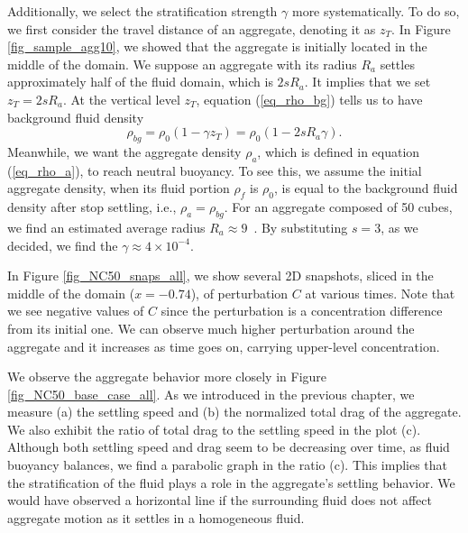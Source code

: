 \par
Additionally, we select the stratification strength $\gamma$ more systematically. 
To do so, we first consider the travel distance of an aggregate, denoting it as $z_T$. In Figure \ref{fig_sample_agg10}, we showed that the aggregate is initially located in the middle of the domain. We suppose an aggregate with its radius $R_a$ settles approximately half of the fluid domain, which is $2 s R_a$. It implies that we set $z_T = 2sR_a$.
At the vertical level $z_T$, equation (\ref{eq_rho_bg}) tells us to have background fluid density 
\begin{equation}
	\rho_{bg} = \rho_0 (1-\gamma z_T) =	\rho_0 (1 - 2sR_a \gamma).
	\label{eq_compute_G}
\end{equation}
Meanwhile, we want the aggregate density $\rho_a$, which is defined in equation (\ref{eq_rho_a}), to reach neutral buoyancy. To see this, we assume the initial aggregate density, when its fluid portion $\rho_f$ is $\rho_0$, is equal to the background fluid density after stop settling, i.e., $\rho_a = \rho_{bg}$. 
For an aggregate composed of 50 cubes, we find an estimated average radius $R_a \approx 9$~\cite{yoo_hydrodynamic_2020}. By substituting $s = 3$, as we decided, we find the $\gamma \approx 4 \times 10^{-4}$.  
\par 
In Figure \ref{fig_NC50_snaps_all}, we show several 2D snapshots, sliced in the middle of the domain ($x = -0.74$), of perturbation $C$ at various times. Note that we see negative values of $C$ since the perturbation is a concentration difference from its initial one. 
We can observe much higher perturbation around the aggregate and it increases as time goes on, carrying upper-level concentration. 
\par
We observe the aggregate behavior more closely in Figure \ref{fig_NC50_base_case_all}. As we introduced in the previous chapter, we measure (a) the settling speed and (b) the normalized total drag of the aggregate. We also exhibit the ratio of total drag to the settling speed in the plot (c). Although both settling speed and drag seem to be decreasing over time, as fluid buoyancy balances, we find a parabolic graph in the ratio (c). This implies that the stratification of the fluid plays a role in the aggregate's settling behavior. 
We would have observed a horizontal line if the surrounding fluid does not affect aggregate motion as it settles in a homogeneous fluid. 
